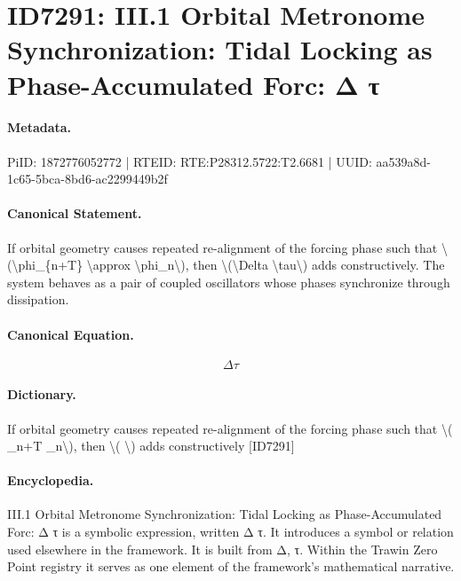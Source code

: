 \section*{ID7291: III.1 Orbital Metronome Synchronization: Tidal Locking as Phase-Accumulated Forc: Δ τ}
\paragraph{Metadata.}
PiID: 1872776052772 | RTEID: RTE:P28312.5722:T2.6681 | UUID: aa539a8d-1c65-5bca-8bd6-ac2299449b2f

\paragraph{Canonical Statement.}
If orbital geometry causes repeated re-alignment of the forcing phase such that \textbackslash{}(\textbackslash{}phi\_\{n+T\} \textbackslash{}approx \textbackslash{}phi\_n\textbackslash{}), then \textbackslash{}(\textbackslash{}Delta \textbackslash{}tau\textbackslash{}) adds constructively. The system behaves as a pair of coupled oscillators whose phases synchronize through dissipation.

\paragraph{Canonical Equation.}
\[
\Delta \tau
\]

\paragraph{Dictionary.}
If orbital geometry causes repeated re-alignment of the forcing phase such that \textbackslash{}( \_n+T \_n\textbackslash{}), then \textbackslash{}( \textbackslash{}) adds constructively [ID7291]

\paragraph{Encyclopedia.}
III.1 Orbital Metronome Synchronization: Tidal Locking as Phase-Accumulated Forc: Δ τ is a symbolic expression, written Δ τ. It introduces a symbol or relation used elsewhere in the framework. It is built from Δ, τ. Within the Trawin Zero Point registry it serves as one element of the framework's mathematical narrative.
